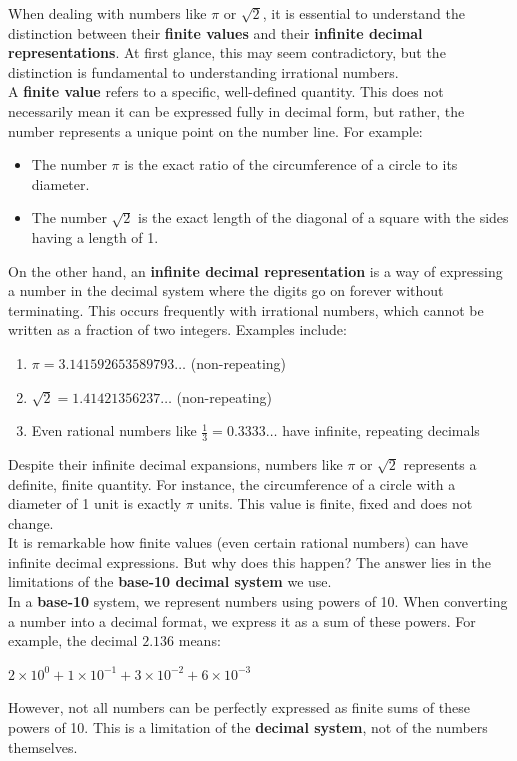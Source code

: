\documentclass[12pt]{article}
\begin{document}
\noindent When dealing with numbers like $\pi$ or $\sqrt{2}$, it is essential to understand the distinction between their \textbf{finite values} and their \textbf{infinite decimal representations}. At first glance, this may seem contradictory, but the distinction is fundamental to understanding irrational numbers.\\

\noindent A \textbf{finite value} refers to a specific, well-defined quantity. This does not necessarily mean it can be expressed fully in decimal form, but rather, the number represents a unique point on the number line. For example:
\begin{itemize}
    \item The number $\pi$ is the exact ratio of the circumference of a circle to its diameter.
    \item The number $\sqrt{2}$ is the exact length of the diagonal of a square with the sides having a length of 1.
\end{itemize}

\noindent On the other hand, an \textbf{infinite decimal representation} is a way of expressing a number in the decimal system where the digits go on forever without terminating. This occurs frequently with irrational numbers, which cannot be written as a fraction of two integers. Examples include:

\begin{enumerate}
    \item $\pi = 3.141592653589793\ldots$ (non-repeating)
    \item $\sqrt{2} = 1.41421356237\ldots$ (non-repeating)
    \item Even rational numbers like $\frac{1}{3} = 0.3333\ldots$ have infinite, repeating decimals
\end{enumerate}

\noindent Despite their infinite decimal expansions, numbers like $\pi$ or $\sqrt{2}$ represents a definite, finite quantity. For instance, the circumference of a circle with a diameter of 1 unit is exactly $\pi$ units. This value is finite, fixed and does not change.\\

\noindent It is remarkable how finite values (even certain rational numbers) can have infinite decimal expressions. But why does this happen? The answer lies in the limitations of the \textbf{base-10 decimal system} we use. \\

\noindent In a \textbf{base-10} system, we represent numbers using powers of 10. When converting a number into a decimal format, we express it as a sum of these powers. For example, the decimal $2.136$ means:
\begin{center}
    $2 \times 10^0 + 1 \times 10^{-1} + 3 \times 10^{-2} + 6 \times 10^{-3}$
\end{center}
However, not all numbers can be perfectly expressed as finite sums of these powers of 10. This is a limitation of the \textbf{decimal system}, not of the numbers themselves.\\
\end{document}
